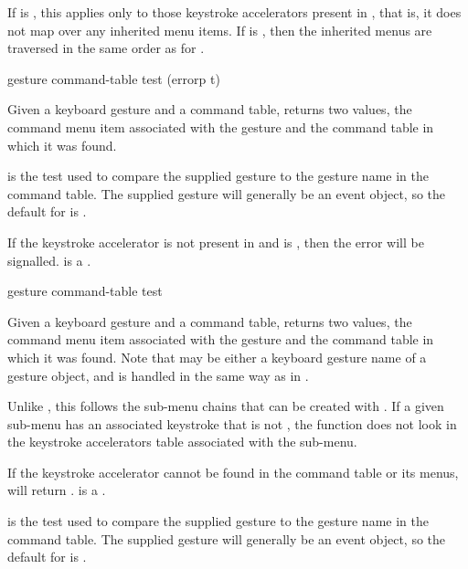 If  is , this applies  only to those
keystroke accelerators present in , that is, it does not
map over any inherited menu items. If  is , then the
inherited menus are traversed in the same order as for
.


 {gesture command-table \key test (errorp t)}

Given a keyboard gesture  and a command table, returns two
values, the command menu item associated with the gesture and the command
table in which it was found.

\ReadOnly

 is the test used to compare the supplied gesture to the gesture name
in the command table.  The supplied gesture will generally be an event object,
so the default for  is .

If the keystroke accelerator is not present in  and
 is , then the  error will be
signalled.   is a .

 {gesture command-table \key test}

Given a keyboard gesture  and a command table, returns two values,
the command menu item associated with the gesture and the command table in which
it was found.  Note that  may be either a keyboard gesture name of
a gesture object, and is handled in the same way as in .

\ReadOnly

Unlike , this follows the sub-menu chains that can be
created with . If a given sub-menu has an
associated keystroke that is not , the function does not look in
the keystroke accelerators table associated with the sub-menu.

If the keystroke accelerator cannot be found in the command table or its
menus,  will return .  is
a .

 is the test used to compare the supplied gesture to the gesture name
in the command table.  The supplied gesture will generally be an event object,
so the default for  is .

